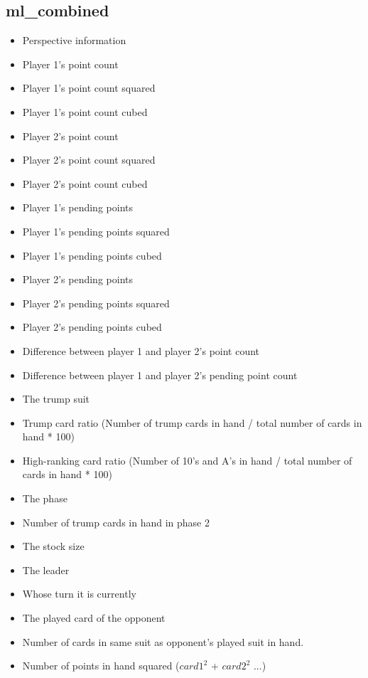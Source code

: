 \documentclass[a4paper,11pt]{article}
\begin{document}
\subsection{ml\_combined}
\begin{itemize}
\item Perspective information
\item Player 1's point count
\item Player 1's point count squared
\item Player 1's point count cubed
\item Player 2's point count
\item Player 2's point count squared
\item Player 2's point count cubed
\item Player 1's pending points
\item Player 1's pending points squared
\item Player 1's pending points cubed
\item Player 2's pending points
\item Player 2's pending points squared
\item Player 2's pending points cubed
\item Difference between player 1 and player 2's point count
\item Difference between player 1 and player 2's pending point count
\item The trump suit
\item Trump card ratio (Number of trump cards in hand / total number of cards in hand * 100)
\item High-ranking card ratio (Number of 10's and A's in hand / total number of cards in hand * 100)
\item The phase
\item Number of trump cards in hand in phase 2
\item The stock size
\item The leader
\item Whose turn it is currently
\item The played card of the opponent
\item Number of cards in same suit as opponent's played suit in hand.
\item Number of points in hand squared ($card1^2$ + $card2^2$ ...)
\end{itemize}
\end{document}
